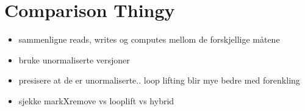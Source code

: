 \section{Comparison Thingy}
\begin{itemize}
  \item sammenligne reads, writes og computes mellom de forskjellige m\aa tene
  \item bruke unormaliserte versjoner
  \item presisere at de er unormaliserte.. loop lifting blir mye bedre med
  forenkling
  \item sjekke markXremove vs looplift vs hybrid
\end{itemize}
